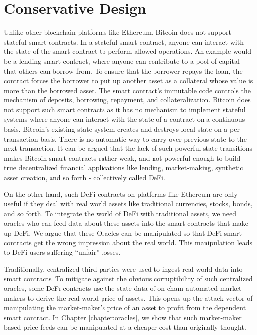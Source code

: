 \section{Conservative Design}
Unlike other blockchain platforms like Ethereum, Bitcoin does not support stateful smart contracts. In a stateful smart contract, anyone can interact with the state of the smart contract to perform allowed operations. An example would be a lending smart contract, where anyone can contribute to a pool of capital that others can borrow from. To ensure that the borrower repays the loan, the contract forces the borrower to put up another asset as a collateral whose value is more than the borrowed asset. The smart contract's immutable code controls the mechanism of deposits, borrowing, repayment, and collateralization. Bitcoin does not support such smart contracts as it has no mechanism to implement stateful systems where anyone can interact with the state of a contract on a continuous basis. Bitcoin's existing state system creates and destroys local state on a per-transaction basis. There is no automatic way to carry over previous state to the next transaction. It can be argued that the lack of such powerful state transitions makes Bitcoin smart contracts rather weak, and not powerful enough to build true decentralized financial applications like lending, market-making, synthetic asset creation, and so forth - collectively called DeFi.

On the other hand, such DeFi contracts on platforms like Ethereum are only useful if they deal with real world assets like traditional currencies, stocks, bonds, and so forth. To integrate the world of DeFi with traditional assets, we need oracles who can feed data about these assets into the smart contracts that make up DeFi. We argue that these Oracles can be manipulated so that DeFi smart contracts get the wrong impression about the real world. This manipulation leads to DeFi users suffering ``unfair'' losses. 

Traditionally, centralized third parties were used to ingest real world data into smart contracts. To mitigate against the obvious corruptibility of such centralized oracles, some DeFi contracts use the state data of on-chain automated market-makers to derive the real world price of assets. This opens up the attack vector of manipulating the market-maker's price of an asset to profit from the dependent smart contract. In Chapter \ref{chapter:oracles}, we show that such market-maker based price feeds can be manipulated at a cheaper cost than originally thought. 

